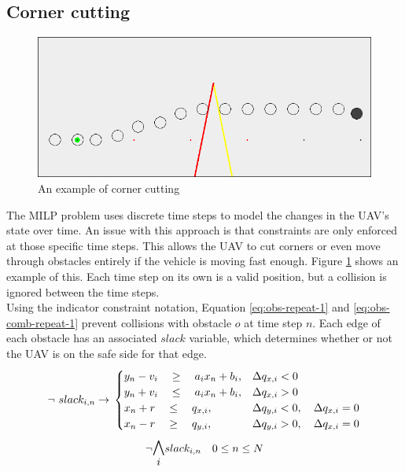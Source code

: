 \subsection{Corner cutting}
\begin{figure}
\includegraphics[width=\textwidth]{img/cornercut_bad}
\caption{An example of corner cutting}
\label{fig:cornercut-example}
\end{figure}
The MILP problem uses discrete time steps to model the changes in the UAV's state over time. An issue with this approach is that constraints are only enforced at those specific time steps. This allows the UAV to cut corners or even move through obstacles entirely if the vehicle is moving fast enough. Figure \ref{fig:cornercut-example} shows an example of this. Each time step on its own is a valid position, but a collision is ignored between the time steps.\\
Using the indicator constraint notation, Equation \ref{eq:obs-repeat-1} and \ref{eq:obs-comb-repeat-1} prevent collisions with obstacle $o$ at time step $n$. Each edge of each obstacle has an associated $slack$ variable, which determines whether or not the UAV is on the safe side for that edge.
\begin{equation}
\label{eq:obs-repeat-1}
\neg ~ slack_{i,n} \rightarrow \\
\begin{cases}
y_{n} -  v_i \quad \geq 
\quad a_{i} x_{n} + b_{i},  	
& \Delta q_{x,i} < 0 							 	
 \\
y_{n} + v_i \quad \leq 
\quad a_{i} x_{n} + b_{i},
& \Delta q_{x,i} > 0 							 	
 \\
x_{n} + r \quad \leq
\quad  q_{x,i}, 		
& \Delta q_{y,i} < 0, \quad \Delta q_{x,i} = 0 	
 \\
x_{n} - r \quad \geq 
\quad q_{y,i},  		
& \Delta q_{y,i} > 0, \quad \Delta q_{x,i} = 0 	
\end{cases}
\end{equation}
\begin{equation}
\label{eq:obs-comb-repeat-1}
\neg \mathlarger{\mathlarger{\bigwedge_{i}}} slack_{i,n} \quad 0 \leq n \leq N
\end{equation}
